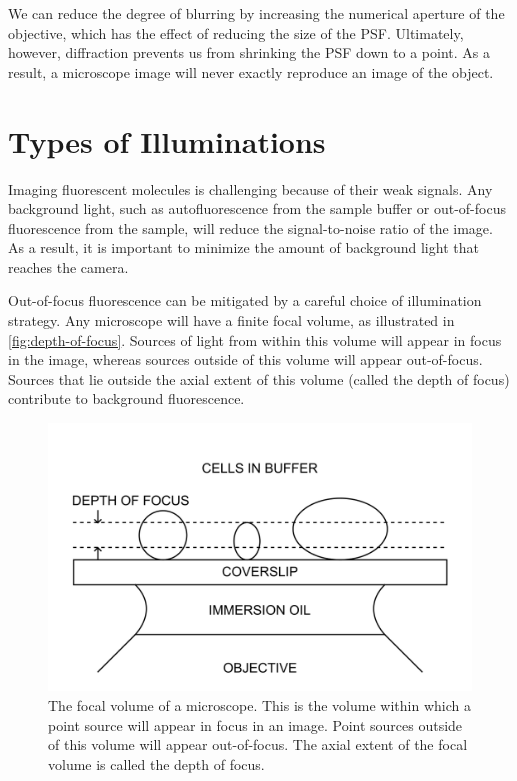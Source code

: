 \documentclass[10pt,a4paper,oneside]{book}
\begin{document}
We can reduce the degree of blurring by increasing the numerical aperture of the objective, which has the effect of reducing the size of the PSF. Ultimately, however, diffraction prevents us from shrinking the PSF down to a point. As a result, a microscope image will never exactly reproduce an image of the object.

\section{Types of Illuminations}

Imaging fluorescent molecules is challenging because of their weak signals. Any background light, such as autofluorescence from the sample buffer or out-of-focus fluorescence from the sample, will reduce the signal-to-noise ratio of the image. As a result, it is important to minimize the amount of background light that reaches the camera.

Out-of-focus fluorescence can be mitigated by a careful choice of illumination strategy. Any microscope will have a finite focal volume, as illustrated in \autoref{fig:depth-of-focus}. Sources of light from within this volume will appear in focus in the image, whereas sources outside of this volume will appear out-of-focus. Sources that lie outside the axial extent of this volume (called the depth of focus) contribute to background fluorescence.

\begin{figure}[ht]
    \centering
    \includegraphics{focal-volume.png}
    \caption{The focal volume of a microscope. This is the volume within which a point source will appear in focus in an image. Point sources outside of this volume will appear out-of-focus. The axial extent of the focal volume is called the depth of focus.}
    \label{fig:depth-of-focus}
\end{figure}
\end{document}

